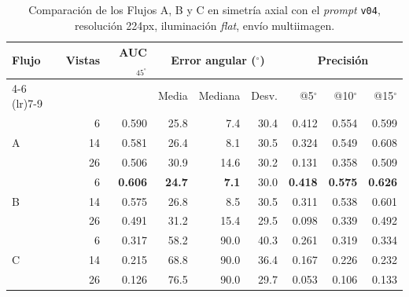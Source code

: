 

\begin{table}[H]
\centering
\caption{Comparación de los Flujos A, B y C en simetría axial con el \textit{prompt} \texttt{v04}, resolución 224px, iluminación \textit{flat}, envío multiimagen.}
\label{tab:nov_axis_flujos}
\footnotesize
\setlength{\tabcolsep}{3pt}
\renewcommand{\arraystretch}{0.95}

\begin{tabular*}{\textwidth}{@{\extracolsep{\fill}}lrrrrrrrr@{}}
\toprule
\multirow{2}{*}{Flujo} & \multirow{2}{*}{Vistas} & \multirow{2}{*}{AUC$_{45^\circ}$} & \multicolumn{3}{c}{Error angular ($^\circ$)} & \multicolumn{3}{c}{Precisión} \\
\cmidrule(lr){4-6} \cmidrule(lr){7-9}
 &  &  & Media & Mediana & Desv. & @5$^\circ$ & @10$^\circ$ & @15$^\circ$ \\
\midrule
\multirow{3}{*}{A} & 6 & 0.590 & 25.8 & 7.4 & 30.4 & 0.412 & 0.554 & 0.599 \\
 & 14 & 0.581 & 26.4 & 8.1 & 30.5 & 0.324 & 0.549 & 0.608 \\
 & 26 & 0.506 & 30.9 & 14.6 & 30.2 & 0.131 & 0.358 & 0.509 \\
\midrule
\multirow{3}{*}{B} & 6 & \textbf{0.606} & \textbf{24.7} & \textbf{7.1} & 30.0 & \textbf{0.418} & \textbf{0.575} & \textbf{0.626} \\
 & 14 & 0.575 & 26.8 & 8.5 & 30.5 & 0.311 & 0.538 & 0.601 \\
 & 26 & 0.491 & 31.2 & 15.4 & 29.5 & 0.098 & 0.339 & 0.492 \\
\midrule
\multirow{3}{*}{C} & 6 & 0.317 & 58.2 & 90.0 & 40.3 & 0.261 & 0.319 & 0.334 \\
 & 14 & 0.215 & 68.8 & 90.0 & 36.4 & 0.167 & 0.226 & 0.232 \\
 & 26 & 0.126 & 76.5 & 90.0 & 29.7 & 0.053 & 0.106 & 0.133 \\
\bottomrule
\end{tabular*}


\end{table}
